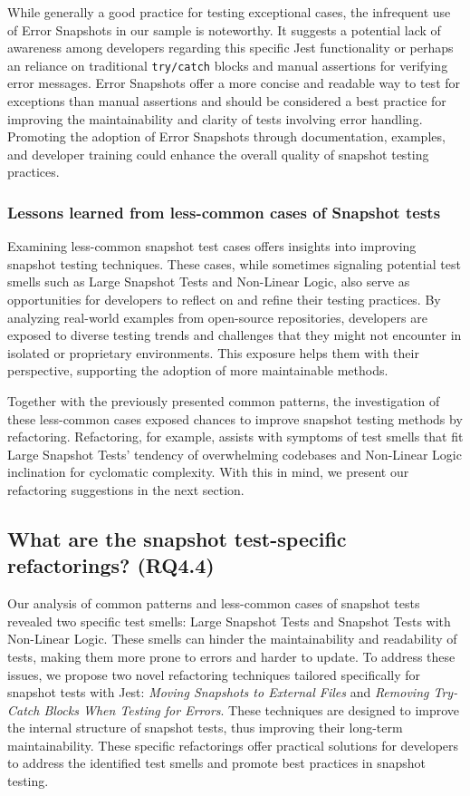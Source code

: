 \documentclass[
	msc, %
	english %
]{../ppgccufmg}
\begin{document}
        While generally a good practice for testing exceptional cases, the infrequent use of Error Snapshots in our sample is noteworthy. It suggests a potential lack of awareness among developers regarding this specific Jest functionality or perhaps an reliance on traditional \texttt{try/catch} blocks and manual assertions for verifying error messages. Error Snapshots offer a more concise and readable way to test for exceptions than manual assertions and should be considered a best practice for improving the maintainability and clarity of tests involving error handling. Promoting the adoption of Error Snapshots through documentation, examples, and developer training could enhance the overall quality of snapshot testing practices.

        \subsubsection{Lessons learned from less-common cases of Snapshot tests}

         Examining less-common snapshot test cases offers insights into improving snapshot testing techniques. These cases, while sometimes signaling potential test smells such as Large Snapshot Tests and Non-Linear Logic, also serve as opportunities for developers to reflect on and refine their testing practices. By analyzing real-world examples from open-source repositories, developers are exposed to diverse testing trends and challenges that they might not encounter in isolated or proprietary environments. This exposure helps them with their perspective, supporting the adoption of more maintainable methods.

        Together with the previously presented common patterns, the investigation of these less-common cases exposed chances to improve snapshot testing methods by refactoring. Refactoring, for example, assists with symptoms of test smells that fit Large Snapshot Tests' tendency of overwhelming codebases and Non-Linear Logic inclination for cyclomatic complexity. With this in mind, we present our refactoring suggestions in the next section.


        \subsection{What are the snapshot test-specific refactorings? (RQ4.4)}
        
        Our analysis of common patterns and less-common cases of snapshot tests revealed two specific test smells: Large Snapshot Tests and Snapshot Tests with Non-Linear Logic. These smells can hinder the maintainability and readability of tests, making them more prone to errors and harder to update. To address these issues, we propose two novel refactoring techniques tailored specifically for snapshot tests with Jest: \textit{Moving Snapshots to External Files} and \textit{Removing Try-Catch Blocks When Testing for Errors}. These techniques are designed to improve the internal structure of snapshot tests, thus improving their long-term maintainability. These specific refactorings offer practical solutions for developers to address the identified test smells and promote best practices in snapshot testing.
        
\end{document}

